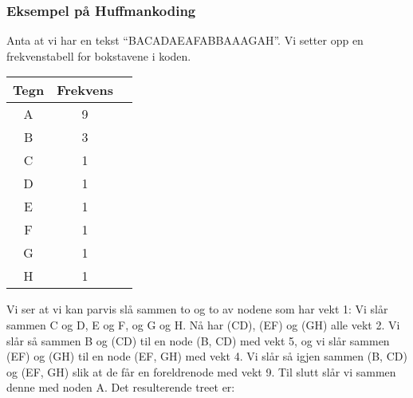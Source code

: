 		\subsubsection{Eksempel på Huffmankoding}
		Anta at vi har en tekst ``BACADAEAFABBAAAGAH''. Vi setter opp en frekvenstabell for bokstavene i koden.
			\begin{center}
				\begin{tabular}{c c c}
					Tegn & Frekvens \\
					\hline
					A & 9\\
					B & 3\\
					C & 1\\
					D & 1\\
					E & 1\\
					F & 1\\
					G & 1\\
					H & 1
				\end{tabular}
			\end{center}
			Vi ser at vi kan parvis slå sammen to og to av nodene som har vekt 1: Vi slår sammen C og D, E og F, og G og H. Nå har (CD), (EF) og (GH) alle vekt 2. Vi slår så sammen B og (CD) til en node (B, CD) med vekt 5, og vi slår sammen (EF) og (GH) til en node (EF, GH) med vekt 4. Vi slår så igjen sammen (B, CD) og (EF, GH) slik at de får en foreldrenode med vekt 9. Til slutt slår vi sammen denne med noden A. Det resulterende treet er:


